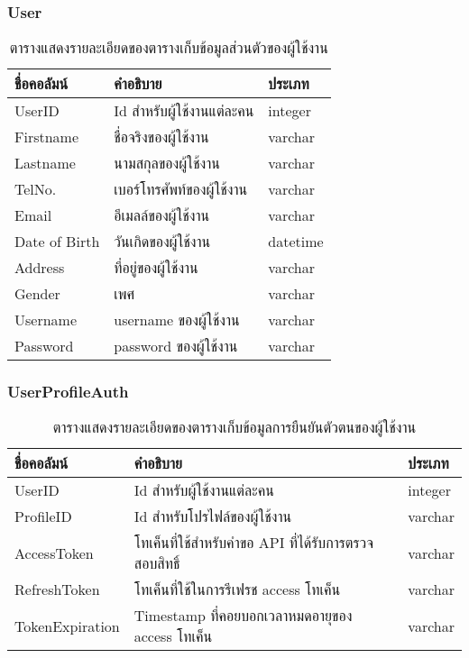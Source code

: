 \documentclass[12pt,oneside,openright,a4paper]{cpe-thai-project}
\begin{document}
\subsubsection{User}
\begin{table}[!h]
\caption{ตารางแสดงรายละเอียดของตารางเก็บข้อมูลส่วนตัวของผู้ใช้งาน}\label{tbl:table3.1}
\begin{tabular}{|l|l|l|}
\hline
\textbf{ชื่อคอลัมน์} & \textbf{คำอธิบาย}         & \textbf{ประเภท} \\ \hline
UserID               & Id สำหรับผู้ใช้งานแต่ละคน & integer         \\ \hline
Firstname            & ชื่อจริงของผู้ใช้งาน      & varchar         \\ \hline
Lastname             & นามสกุลของผู้ใช้งาน       & varchar         \\ \hline
TelNo.               & เบอร์โทรศัพท์ของผู้ใช้งาน & varchar         \\ \hline
Email                & อีเมลล์ของผู้ใช้งาน       & varchar         \\ \hline
Date of Birth        & วันเกิดของผู้ใช้งาน       & datetime        \\ \hline
Address              & ที่อยู่ของผู้ใช้งาน       & varchar         \\ \hline
Gender               & เพศ                       & varchar         \\ \hline
Username             & username ของผู้ใช้งาน     & varchar         \\ \hline
Password             & password ของผู้ใช้งาน     & varchar         \\ \hline
\end{tabular}
\end{table}

\subsubsection{UserProfileAuth}
\begin{table}[!h]
\caption{ตารางแสดงรายละเอียดของตารางเก็บข้อมูลการยืนยันตัวตนของผู้ใช้งาน}\label{tbl:table3.2}
\begin{tabular}{|l|l|l|}
\hline
\textbf{ชื่อคอลัมน์} & \textbf{คำอธิบาย}                                                            & \textbf{ประเภท} \\ \hline
UserID               & Id สำหรับผู้ใช้งานแต่ละคน                                                    & integer         \\ \hline
ProfileID            & Id สำหรับโปรไฟล์ของผู้ใช้งาน                                                 & varchar         \\ \hline
AccessToken          & โทเค็นที่ใช้สำหรับคำขอ API ที่ได้รับการตรวจสอบสิทธิ์ & varchar         \\ \hline
RefreshToken         & โทเค็นที่ใช้ในการรีเฟรช access โทเค็น                & varchar         \\ \hline
TokenExpiration      & Timestamp ที่คอยบอกเวลาหมดอายุของ access โทเค็น                              & varchar         \\ \hline
\end{tabular}
\end{table}
\end{document}
